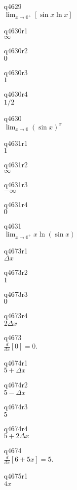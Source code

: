 q4629\\
\(\displaystyle \lim_{x \rightarrow 0^+} [\sin x \ln x] \)

q4630r1\\
\(\displaystyle \infty \)

q4630r2\\
\(\displaystyle 0 \)

q4630r3\\
\(\displaystyle 1 \)

q4630r4\\
\(\displaystyle 1/2 \)

q4630\\
\(\displaystyle \lim_{x \rightarrow 0} (\sin x)^x \)

q4631r1\\
\(\displaystyle 1 \)

q4631r2\\
\(\displaystyle \infty \)

q4631r3\\
\(\displaystyle -\infty \)

q4631r4\\
\(\displaystyle 0 \)

q4631\\
\(\displaystyle \lim_{x \rightarrow 0^+} x \ln (\sin x) \)

q4673r1\\
\(\displaystyle \Delta x \)

q4673r2\\
\(\displaystyle 1 \)

q4673r3\\
\(\displaystyle 0 \)

q4673r4\\
\(\displaystyle 2\Delta x \)

q4673\\
\(\displaystyle \frac{d}{dx}[0] = 0. \)

q4674r1\\
\(\displaystyle 5 + \Delta x \)

q4674r2\\
\(\displaystyle 5 - \Delta x \)

q4674r3\\
\(\displaystyle 5 \)

q4674r4\\
\(\displaystyle 5 + 2\Delta x \)

q4674\\
\(\displaystyle \frac{d}{dx}[6 + 5x] = 5. \)

q4675r1\\
\(\displaystyle 4x \)

